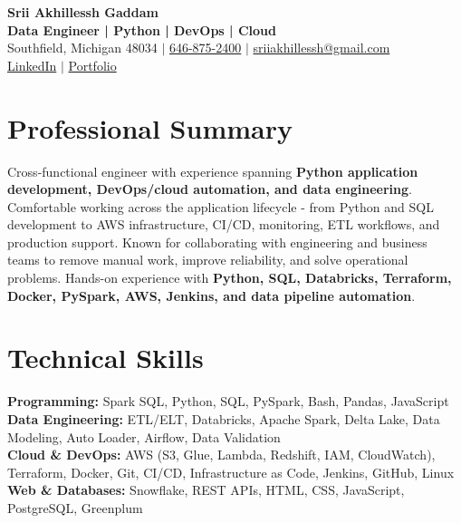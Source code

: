 \documentclass[letterpaper,10pt]{article}
\begin{document}
\fontsize{9.35pt}{10.45pt}\selectfont

\begin{center}
    {\LARGE \textbf{Srii Akhillessh Gaddam}} \\[-1pt]
    \textbf{Data Engineer | Python | DevOps | Cloud} \\[2pt]
    Southfield, Michigan 48034 $|$
    \href{tel:6468752400}{646-875-2400} $|$
    \href{mailto:sriiakhillessh@gmail.com}{sriiakhillessh@gmail.com} \\[1pt]
    \href{https://www.linkedin.com/in/srii-akhiilessh-gaddam-b48668191/}{LinkedIn} $|$
    \href{https://sriiakhillesshg.github.io/portfolio/}{Portfolio}
\end{center}
\vspace{-8pt}

\section{Professional Summary}
\small{Cross-functional engineer with experience spanning \textbf{Python application development, DevOps/cloud automation, and data engineering}. Comfortable working across the application lifecycle - from Python and SQL development to AWS infrastructure, CI/CD, monitoring, ETL workflows, and production support. Known for collaborating with engineering and business teams to remove manual work, improve reliability, and solve operational problems. Hands-on experience with \textbf{Python, SQL, Databricks, Terraform, Docker, PySpark, AWS, Jenkins, and data pipeline automation}.}

\section{Technical Skills}
\small{
\textbf{Programming:} Spark SQL, Python, SQL, PySpark, Bash, Pandas, JavaScript \\
\textbf{Data Engineering:} ETL/ELT, Databricks, Apache Spark, Delta Lake, Data Modeling, Auto Loader, Airflow, Data Validation \\
\textbf{Cloud \& DevOps:} AWS (S3, Glue, Lambda, Redshift, IAM, CloudWatch), Terraform, Docker, Git, CI/CD, Infrastructure as Code, Jenkins, GitHub, Linux \\
\textbf{Web \& Databases:} Snowflake, REST APIs, HTML, CSS, JavaScript, PostgreSQL, Greenplum
}
\end{document}
